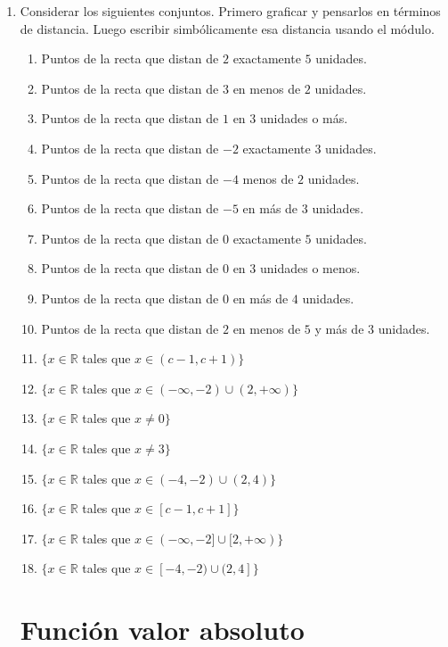 \documentclass[12pt]{article}
\theoremstyle{definition}
\begin{document}
\begin{enumerate}
\item Considerar los siguientes conjuntos. Primero graficar y pensarlos en términos de distancia. Luego escribir simbólicamente esa distancia usando el módulo.
\begin{enumerate}
\setlength\itemsep{0em}
\item Puntos de la recta que distan de $2$ exactamente $5$ unidades.
\item Puntos de la recta que distan de $3$ en menos de $2$ unidades.
\item Puntos de la recta que distan de $1$ en $3$ unidades o más.
\item Puntos de la recta que distan de $-2$ exactamente $3$  unidades.
\item Puntos de la recta que distan de $-4$ menos de $2$ unidades.
\item Puntos de la recta que distan de $-5$ en más de $3$ unidades.
\item Puntos de la recta que distan de $0$ exactamente $5$ unidades.
\item Puntos de la recta que distan de $0$ en $3$ unidades o menos.
\item Puntos de la recta que distan de $0$ en más de $4$ unidades.
\item Puntos de la recta que distan de $2$ en  menos de  $5$ y más de $3$ unidades.
\item $\{ x \in \mathbb{R}$ tales que $x \in (c -1, c+1)\}$
\item $\{ x \in \mathbb{R}$ tales que $x \in (-\infty, -2) \cup (2, + \infty)\}$
\item $\{ x \in \mathbb{R}$ tales  que $x \neq 0\}$
\item $\{ x \in \mathbb{R}$ tales  que $x \neq 3\}$
\item $\{ x \in \mathbb{R}$ tales  que $x \in (-4, -2) \cup (2, 4)\}$
\item $\{ x \in \mathbb{R}$ tales  que $x \in [c - 1, c+1]\}$
\item $\{ x \in \mathbb{R}$ tales  que $x \in (- \infty, -2] \cup [2, +\infty)\}$
\item $\{ x \in \mathbb{R}$ tales  que $x \in [- 4, -2) \cup (2, 4]\}$
\end{enumerate}

\section{Función valor absoluto}


\end{enumerate}
\end{document}
